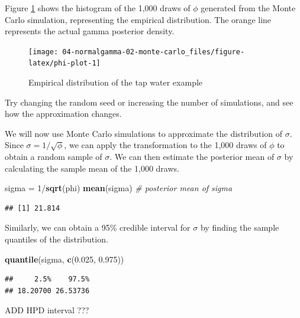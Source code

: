 \documentclass[]{book}
\newenvironment{Shaded}{\begin{snugshade}}{\end{snugshade}}
\newcommand{\KeywordTok}[1]{\textcolor[rgb]{0.13,0.29,0.53}{\textbf{{#1}}}}
\newcommand{\DecValTok}[1]{\textcolor[rgb]{0.00,0.00,0.81}{{#1}}}
\newcommand{\FloatTok}[1]{\textcolor[rgb]{0.00,0.00,0.81}{{#1}}}
\newcommand{\StringTok}[1]{\textcolor[rgb]{0.31,0.60,0.02}{{#1}}}
\newcommand{\CommentTok}[1]{\textcolor[rgb]{0.56,0.35,0.01}{\textit{{#1}}}}
\newcommand{\NormalTok}[1]{{#1}}
\theoremstyle{definition}
\theoremstyle{definition}
\theoremstyle{definition}
\theoremstyle{remark}
\begin{document}
Figure \ref{fig:phi-plot} shows the histogram of the 1,000 draws of
\(\phi\) generated from the Monte Carlo simulation, representing the
empirical distribution. The orange line represents the actual gamma
posterior density.

\begin{figure}

{\centering \texttt{[image: 04-normalgamma-02-monte-carlo\_files/figure-latex/phi-plot-1]} 

}

\caption{Empirical distribution of the tap water example}\label{fig:phi-plot}
\end{figure}

Try changing the random seed or increasing the number of simulations,
and see how the approximation changes.

We will now use Monte Carlo simulations to approximate the distribution
of \(\sigma\). Since \(\sigma = 1/\sqrt{\phi}\), we can apply the
transformation to the 1,000 draws of \(\phi\) to obtain a random sample
of \(\sigma\). We can then estimate the posterior mean of \(\sigma\) by
calculating the sample mean of the 1,000 draws.

\begin{Shaded}
\begin{Highlighting}[]
\NormalTok{sigma =}\StringTok{ }\DecValTok{1}\NormalTok{/}\KeywordTok{sqrt}\NormalTok{(phi)}
\KeywordTok{mean}\NormalTok{(sigma) }\CommentTok{# posterior mean of sigma}
\end{Highlighting}
\end{Shaded}

\begin{verbatim}
## [1] 21.814
\end{verbatim}

Similarly, we can obtain a 95\% credible interval for \(\sigma\) by
finding the sample quantiles of the distribution.

\begin{Shaded}
\begin{Highlighting}[]
\KeywordTok{quantile}\NormalTok{(sigma, }\KeywordTok{c}\NormalTok{(}\FloatTok{0.025}\NormalTok{, }\FloatTok{0.975}\NormalTok{))}
\end{Highlighting}
\end{Shaded}

\begin{verbatim}
##     2.5%    97.5% 
## 18.20700 26.53736
\end{verbatim}

ADD HPD interval ???
\end{document}
